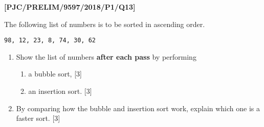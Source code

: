 \item \textbf{{[}PJC/PRELIM/9597/2018/P1/Q13{]} }

The following list of numbers is to be sorted in ascending order. 
\noindent \begin{center}
\texttt{98, 12, 23, 8, 74, 30, 62 }
\par\end{center}
\begin{enumerate}
\item Show the list of numbers \textbf{after each pass} by performing
\begin{enumerate}
\item a bubble sort, \hfill{}{[}3{]}
\item an insertion sort. \hfill{}{[}3{]}
\end{enumerate}
\item By comparing how the bubble and insertion sort work, explain which
one is a faster sort. \hfill{}{[}3{]}
\end{enumerate}
